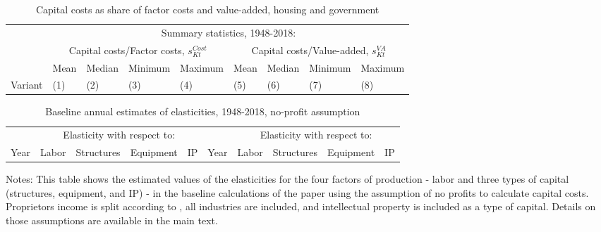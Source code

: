 \documentclass[11pt]{article}
\begin{document}
\begin{table}[!htb]
\begin{center}
\caption{Capital costs as share of factor costs and value-added, housing and government}
\label{TAB_ratios}
{\footnotesize
\begin{tabularx}{\textwidth}{lXXXXXXXX}
\midrule
        & \multicolumn{8}{c}{Summary statistics, 1948-2018:} \\ \cmidrule(lr){2-9} 
        & \multicolumn{4}{c}{Capital costs/Factor costs, $s^{Cost}_{Kt}$} & \multicolumn{4}{c}{Capital costs/Value-added, $s^{VA}_{Kt}$} \\ \cmidrule(lr){2-5} \cmidrule(lr){6-9} 
 &  Mean & Median  & Minimum & Maximum  &  Mean & Median  & Minimum & Maximum \\
Variant & (1) & (2) & (3) & (4) & (5) & (6) & (7) & (8) \\
\midrule

\midrule
\end{tabularx}
}
\end{center}
\vspace{-.5cm}
\end{table}


\begin{table}[!htb]
\begin{center}
\label{TAB_annual_noprofit}
\caption{Baseline annual estimates of elasticities, 1948-2018, no-profit assumption}
{\footnotesize
\begin{tabularx}{\textwidth}{XXXXXXXXXX}
\midrule
& \multicolumn{4}{c}{Elasticity with respect to:} & & \multicolumn{4}{c}{Elasticity with respect to:} \\ \cmidrule(lr){2-5} \cmidrule(lr){7-10}
Year  & Labor  & Structures & Equipment & IP & Year  & Labor  & Structures & Equipment & IP \\ 
\midrule

\midrule
\end{tabularx}
}
\end{center}
{\footnotesize Notes: This table shows the estimated values of the elasticities for the four factors of production - labor and three types of capital (structures, equipment, and IP) - in the baseline calculations of the paper using the assumption of no profits to calculate capital costs. Proprietors income is split according to \cite{gommerupert2004}, all industries are included, and intellectual property is included as a type of capital. Details on those assumptions are available in the main text.}
\end{table}
\end{document}
